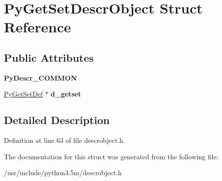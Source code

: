 \hypertarget{structPyGetSetDescrObject}{}\section{Py\+Get\+Set\+Descr\+Object Struct Reference}
\label{structPyGetSetDescrObject}
\subsection*{Public Attributes}
\begin{DoxyCompactItemize}
\item 
{\bfseries Py\+Descr\+\_\+\+C\+O\+M\+M\+ON}\hypertarget{structPyGetSetDescrObject_ae3a0a2d48ea91c279a98fd81f7a16e53}{}\label{structPyGetSetDescrObject_ae3a0a2d48ea91c279a98fd81f7a16e53}

\item 
\hyperlink{structPyGetSetDef}{Py\+Get\+Set\+Def} $\ast$ {\bfseries d\+\_\+getset}\hypertarget{structPyGetSetDescrObject_a5fea3428311519839767a9c26edddb70}{}\label{structPyGetSetDescrObject_a5fea3428311519839767a9c26edddb70}

\end{DoxyCompactItemize}


\subsection{Detailed Description}


Definition at line 63 of file descrobject.\+h.



The documentation for this struct was generated from the following file\+:\begin{DoxyCompactItemize}
\item 
/usr/include/python3.\+5m/descrobject.\+h\end{DoxyCompactItemize}
